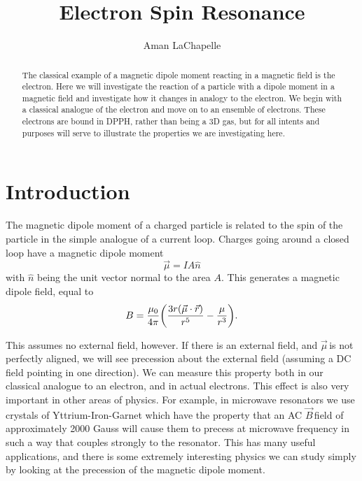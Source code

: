 \documentclass{article}
\title{Electron Spin Resonance}
\author{Aman LaChapelle}
\newcommand{\dipole}{$\vec{\mu}\,$}
\newcommand{\B}{$\vec{B}\,$}
\begin{document}
\raggedright
\maketitle

\begin{abstract}
	The classical example of a magnetic dipole moment reacting in a magnetic field is the electron.  Here we will investigate the reaction of a particle with a dipole moment in a magnetic field and investigate how it changes in analogy to the electron.  We begin with a classical analogue of the electron and move on to an ensemble of electrons.  These electrons are bound in DPPH, rather than being a 3D gas, but for all intents and purposes will serve to illustrate the properties we are investigating here.
\end{abstract}

\tableofcontents
\newpage

\section{Introduction}
	The magnetic dipole moment of a charged particle is related to the spin of the particle in the simple analogue of a current loop.  Charges going around a closed loop have a magnetic dipole moment
	\begin{equation*}
		\vec{\mu} = IA\hat{n}
	\end{equation*}
	with $\hat{n}$ being the unit vector normal to the area $A$.  This generates a magnetic dipole field, equal to
	\begin{equation*}
		B = \frac{\mu_0}{4\pi}\bigg{(}\frac{3r(\vec{\mu} \cdot \vec{r})}{r^5} - \frac{\mu}{r^3}\bigg{)}.
	\end{equation*}

	This assumes no external field, however.  If there is an external field, and \dipole is not perfectly aligned, we will see precession about the external field (assuming a DC field pointing in one direction).  We can measure this property both in our classical analogue to an electron, and in actual electrons.  This effect is also very important in other areas of physics.  For example, in microwave resonators we use crystals of Yttrium-Iron-Garnet which have the property that an AC \B field of approximately 2000 Gauss will cause them to precess at microwave frequency in such a way that couples strongly to the resonator.  This has many useful applications, and there is some extremely interesting physics we can study simply by looking at the precession of the magnetic dipole moment.
\end{document}
